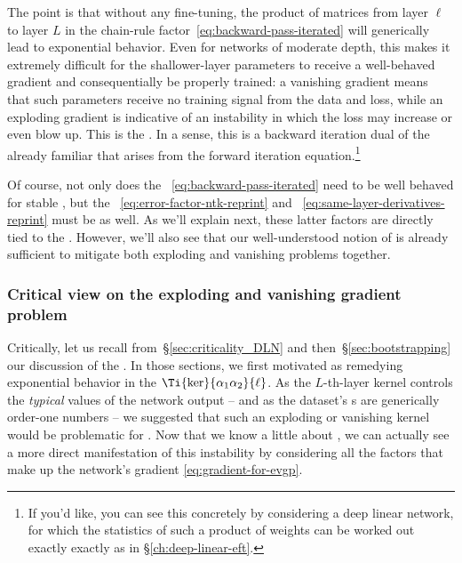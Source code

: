 The point is that without any fine-tuning, the product of matrices from layer $\ell$ to layer $L$ in the chain-rule factor~\eqref{eq:backward-pass-iterated} will generically lead to exponential behavior. Even for networks of moderate depth, this makes it extremely difficult for the shallower-layer parameters to receive a well-behaved gradient and consequentially be properly trained: a vanishing gradient means that such parameters receive no training signal from the data and loss, while an exploding gradient is indicative of an instability in which the loss may increase or even blow up.
This is the .
In a sense, this is a backward iteration dual of the already familiar  that arises from the forward iteration equation.\footnote{
If you'd like, you can see this  concretely by considering a deep linear network, for which the statistics of such a product of weights can be worked out exactly exactly as in \S\ref{ch:deep-linear-eft}.}

Of course, not only does the ~\eqref{eq:backward-pass-iterated} need to be well behaved for stable , but the ~\eqref{eq:error-factor-ntk-reprint} and ~\eqref{eq:same-layer-derivatives-reprint} must be as well. As we'll explain next, these latter factors are directly tied to the . However, we'll also see that our well-understood notion of  is already sufficient to mitigate both exploding and vanishing problems together.





\subsubsection{Critical view on the exploding and vanishing gradient problem}
Critically, let us recall from~\S\ref{sec:criticality_DLN} and then~\S\ref{sec:bootstrapping} our discussion of the . In those sections, we first motivated  as remedying exponential behavior in the  $\Ti{\ker}{\alpha_1\alpha_2}{\ell}$. As the $L$-th-layer kernel controls the \emph{typical} values of the network output -- and as the dataset's s are generically order-one numbers -- we suggested that such an exploding or vanishing kernel would be problematic for . 
Now that we know a little about , we can actually see a more direct manifestation of this instability by considering all the factors that make up the network's gradient \eqref{eq:gradient-for-evgp}.


